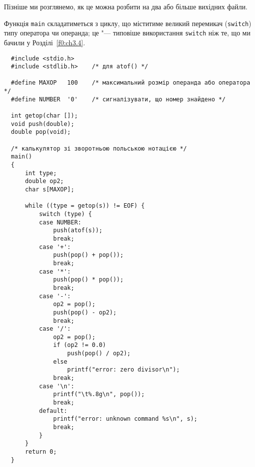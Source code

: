 \documentclass[a4paper,12pt]{book}
\begin{document}
  Пізніше ми розглянемо, як це можна розбити на два або більше вихідних файли.

  Функція \texttt{main} складатиметься з циклу, що міститиме великий перемикач
  (\texttt{switch}) типу оператора чи операнда; це "--- типовіше використання
  \texttt{switch} ніж те, що ми бачили у Розділі~\ref{f0:ch3.4}.

  \begin{verbatim}
  #include <stdio.h>
  #include <stdlib.h>    /* для atof() */

  #define MAXOP   100    /* максимальний розмір операнда або оператора */
  #define NUMBER  '0'    /* сигналізувати, що номер знайдено */

  int getop(char []);
  void push(double);
  double pop(void);

  /* калькулятор зі зворотньою польською нотацією */
  main()
  {
      int type;
      double op2;
      char s[MAXOP];

      while ((type = getop(s)) != EOF) {
          switch (type) {
          case NUMBER:
              push(atof(s));
              break;
          case '+':
              push(pop() + pop());
              break;
          case '*':
              push(pop() * pop());
              break;
          case '-':
              op2 = pop();
              push(pop() - op2);
              break;
          case '/':
              op2 = pop();
              if (op2 != 0.0)
                  push(pop() / op2);
              else
                  printf("error: zero divisor\n");
              break;
          case '\n':
              printf("\t%.8g\n", pop());
              break;
          default:
              printf("error: unknown command %s\n", s);
              break;
          }
      }
      return 0;
  }
  \end{verbatim}
\end{document}
